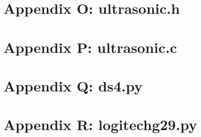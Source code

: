\documentclass[letterpaper,11pt]{texMemo} %
\begin{document}
\section*{Appendix O: ultrasonic.h}
\begin{tiny}

\end{tiny}
\newpage

\section*{Appendix P: ultrasonic.c}
\begin{tiny}

\end{tiny}
\newpage

\section*{Appendix Q: ds4.py}
\begin{tiny}

\end{tiny}
\newpage

\section*{Appendix R: logitechg29.py}
\begin{tiny}

\end{tiny}
\newpage
\end{document}
